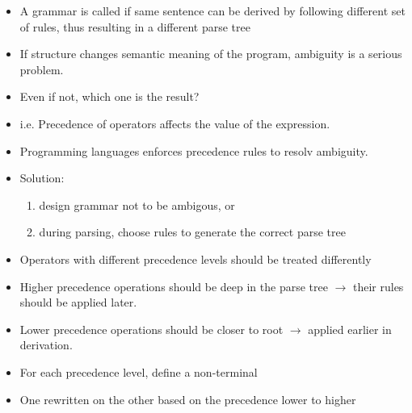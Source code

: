 \begin{frame}
\begin{itemize}
\item A grammar is called  if same sentence can be
derived by following different set of rules, thus resulting in a different parse tree
\item If structure changes semantic meaning of the program, ambiguity is a serious problem.
\item Even if not, which one is the result?
\item i.e. Precedence of operators affects the value of the expression.
\item Programming languages enforces precedence rules to resolv
	ambiguity.
\item Solution:\\
	\begin{enumerate}
	\item design grammar not to be ambigous, or
	\item during parsing, choose rules to generate the correct parse tree
	\end{enumerate}
\end{itemize}
\end{frame}

\begin{frame}
\begin{itemize}
\frametitle{Precedence and Grammar}
\item Operators with different precedence levels should be treated differently
\item Higher precedence operations should be deep in the parse tree $\rightarrow$ their rules should be applied later.
\item Lower precedence operations should be closer to root $\rightarrow$ applied earlier in derivation.
\item  For each precedence level, define a non-terminal 
\item One rewritten on the other based on the precedence lower to higher
\end{itemize}
\end{frame}

